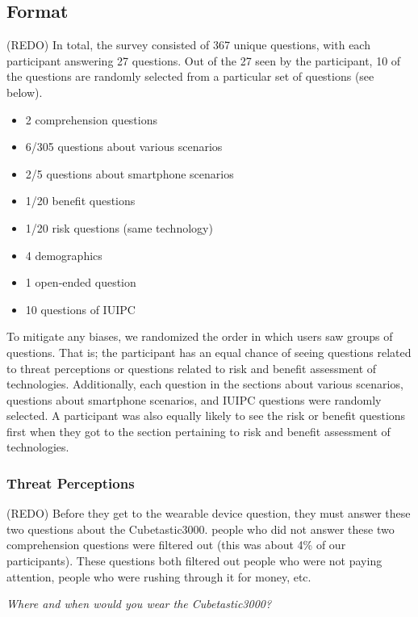 \documentclass{acm_proc_article-sp}
\begin{document}
\subsection{Format}
(REDO) In total, the survey consisted of 367 unique questions, with each participant answering 27 questions. Out of the 27 seen by the participant, 10 of the questions are randomly selected from a particular set of questions (see below).   \\[-.8cm]

\begin{itemize} \itemsep1pt \parskip0pt 
\item 2 comprehension questions 
\item 6/305 questions about various scenarios 
\item 2/5 questions about smartphone scenarios 
\item 1/20 benefit questions 
\item 1/20 risk questions (same technology) 
\item 4 demographics
\item 1 open-ended question 
\item 10 questions of IUIPC \\[-.8cm]
\end{itemize}

To mitigate any biases, we randomized the order in which users saw groups of questions. That is; the participant has an equal chance of seeing questions related to threat perceptions or questions related to risk and benefit assessment of technologies. Additionally, each question in the sections about various scenarios, questions about smartphone scenarios, and IUIPC questions were randomly selected. A participant was also equally likely to see the risk or benefit questions first when they got to the section pertaining to risk and benefit assessment of technologies. 

\subsubsection{Threat Perceptions}
(REDO) Before they get to the wearable device question, they must answer these two questions about the Cubetastic3000. people who did not answer these two comprehension questions were filtered out (this was about 4\% of our participants). These questions both filtered out people who were not paying attention, people who were rushing through it for money, etc. 

\textit{Where and when would you wear the Cubetastic3000?}\\[-.5cm]
\end{document}
